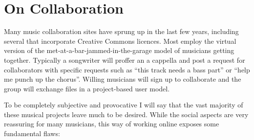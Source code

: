 \section{On Collaboration}
\label{s:unexpected_collaborations:collaboration}

Many music collaboration sites have sprung up in the last few years, including
several that incorporate Creative Commons licences. Most employ the virtual
version of the met-at-a-bar-jammed-in-the-garage model of musicians getting
together. Typically a songwriter will prof\hbox{}fer an a cappella and post a
request for collaborators with specif\hbox{}ic requests such as ``this track needs a
bass part'' or ``help me punch up the chorus''. Willing musicians will sign up to
collaborate and the group will exchange f\hbox{}iles in a project-based user model.

To be completely subjective and provocative I will say that the vast majority of
these musical projects leave much to be desired. While the social aspects are
very reassuring for many musicians, this way of working online exposes some
fundamental f\hbox{}laws:

